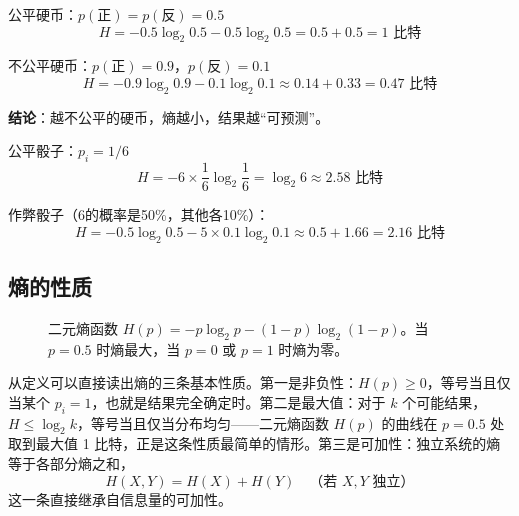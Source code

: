 \begin{example}[抛硬币]
公平硬币：$p(\text{正}) = p(\text{反}) = 0.5$
\[
H = -0.5 \log_2 0.5 - 0.5 \log_2 0.5 = 0.5 + 0.5 = 1 \text{ 比特}
\]

不公平硬币：$p(\text{正}) = 0.9$，$p(\text{反}) = 0.1$
\[
H = -0.9 \log_2 0.9 - 0.1 \log_2 0.1 \approx 0.14 + 0.33 = 0.47 \text{ 比特}
\]

\textbf{结论}：越不公平的硬币，熵越小，结果越“可预测”。
\end{example}

\begin{example}[掷骰子]
公平骰子：$p_i = 1/6$
\[
H = -6 \times \frac{1}{6} \log_2 \frac{1}{6} = \log_2 6 \approx 2.58 \text{ 比特}
\]

作弊骰子（6的概率是50\%，其他各10\%）：
\[
H = -0.5 \log_2 0.5 - 5 \times 0.1 \log_2 0.1 \approx 0.5 + 1.66 = 2.16 \text{ 比特}
\]
\end{example}

\subsection{熵的性质}

\begin{figure}[htbp]
\centering
{}
\caption{二元熵函数 $H(p) = -p\log_2 p - (1-p)\log_2(1-p)$。当 $p=0.5$ 时熵最大，当 $p=0$ 或 $p=1$ 时熵为零。}
\end{figure}

从定义可以直接读出熵的三条基本性质。第一是非负性：$H(p) \geq 0$，等号当且仅当某个 $p_i = 1$，也就是结果完全确定时。第二是最大值：对于 $k$ 个可能结果，$H \leq \log_2 k$，等号当且仅当分布均匀——二元熵函数 $H(p)$ 的曲线在 $p = 0.5$ 处取到最大值 1 比特，正是这条性质最简单的情形。第三是可加性：独立系统的熵等于各部分熵之和，
\[
H(X, Y) = H(X) + H(Y) \quad \text{（若 $X, Y$ 独立）}
\]
这一条直接继承自信息量的可加性。

